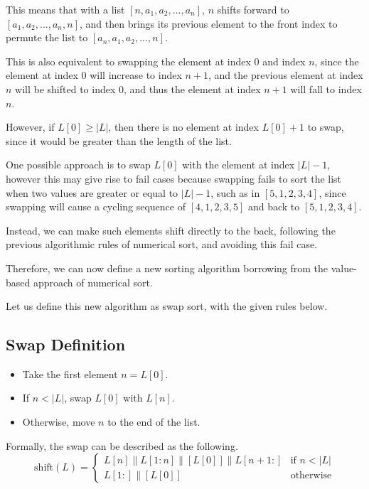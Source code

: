 \documentclass[12pt]{article}
\begin{document}
This means that with a list $[n, a_1, a_2, ..., a_n]$, $n$ shifts forward to $[a_1, a_2, ..., a_n, n]$, and then brings its previous element to the front index to permute the list to $[a_n, a_1, a_2, ...,n]$.

This is also equivalent to swapping the element at index 0 and index $n$, since the element at index 0 will increase to index $n+1$, and the previous element at index $n$ will be shifted to index 0, and thus the element at index $n+1$ will fall to index $n$.

However, if $L[0]\geq|L|$, then there is no element at index $L[0]+1$ to swap, since it would be greater than the length of the list.

One possible approach is to swap $L[0]$ with the element at index $|L|-1$, however this may give rise to fail cases because swapping fails to sort the list when two values are greater or equal to $|L|-1$, such as in $[5,1,2,3,4]$, since swapping will cause a cycling sequence of $[4,1,2,3,5]$ and back to $[5,1,2,3,4]$.

Instead, we can make such elements shift directly to the back, following the previous algorithmic rules of numerical sort, and avoiding this fail case.

Therefore, we can now define a new sorting algorithm borrowing from the value-based approach of numerical sort.

Let us define this new algorithm as swap sort, with the given rules below.

\subsection*{Swap Definition}

\begin{itemize}
    \item Take the first element $n = L[0]$.
    \item If $n < |L|$, swap $L[0]$ with $L[n]$.
    \item Otherwise, move $n$ to the end of the list.
\end{itemize}

Formally, the swap can be described as the following.
\[
\text{shift}(L) = 
\begin{cases}
L[n] \| L[1:n] \| [L[0]] \| L[n+1:] & \text{if } n < |L|\\
L[1:] \| [L[0]] & \text{otherwise}
\end{cases}
\]
\end{document}
